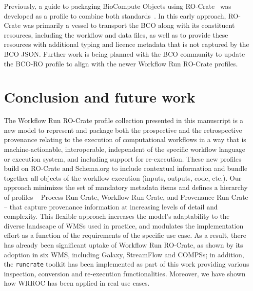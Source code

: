 Previously, a guide to packaging BioCompute Objects using RO-Crate~\cite{bco-roc} was developed as a profile to combine both standards~\cite{Soiland-Reyes 2021}.
In this early approach, RO-Crate was primarily a vessel to transport the BCO along with its constituent resources, including the workflow and data files, as well as to provide these resources with additional typing and licence metadata that is not captured by the BCO JSON.
Further work is being planned with the BCO community to update the BCO-RO profile to align with the newer Workflow Run RO-Crate profiles. 

\hypertarget{conclusion}{%
\section{Conclusion and future work}\label{wrroc:conclusion}}

The Workflow Run RO-Crate profile collection presented in this manuscript is a
new model to represent and package both the prospective
and the retrospective provenance relating to the execution of computational
workflows in a way that is
machine-actionable, interoperable, independent of the specific workflow language or
execution system, and including support for re-execution.
%
These new profiles build on RO-Crate and Schema.org to include contextual
information and bundle together all objects of the workflow execution
(inputs, outputs, code, etc.).
%
Our approach minimizes the set of mandatory metadata items
and defines a hierarchy of profiles -- Process Run Crate, Workflow Run
Crate, and Provenance Run Crate -- that capture provenance information at increasing
levels of detail and complexity.
This flexible approach increases the model’s adaptability to the diverse
landscape of WMSs used in practice, and modulates the implementation effort as a
function of the requirements of the specific use case.
As a result, there has already been significant uptake of Workflow Run RO-Crate, as shown by its adoption in six WMS, including Galaxy, StreamFlow and COMPSs;
in addition, the \texttt{runcrate} toolkit has been implemented as part of this
work providing various inspection, conversion and re-execution functionalities.
Moreover, we have shown how WRROC has been applied in real use cases.

